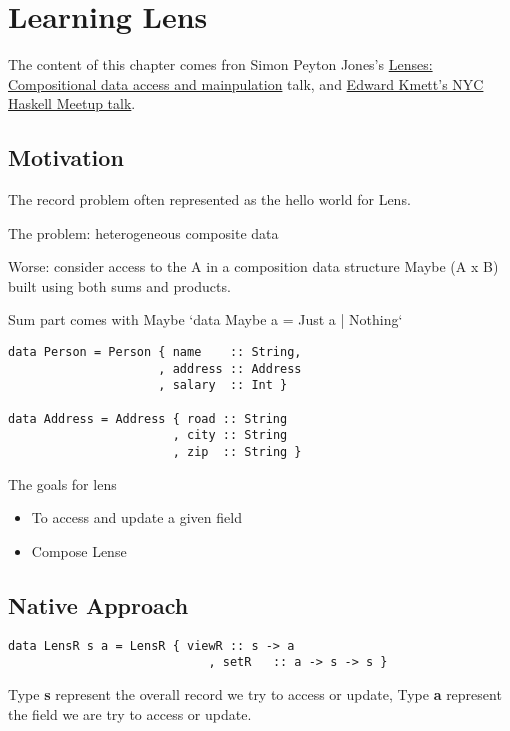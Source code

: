 \chapter{Learning Lens}

The content of this chapter comes fron Simon Peyton Jones's \href{https://skillsmatter.com/skillscasts/4251-lenses-compositional-data-access-and-manipulation}{Lenses: Compositional data access and mainpulation} talk,
and \href{https://www.youtube.com/watch?v=cefnmjtAolY}{Edward Kmett's NYC Haskell Meetup talk}.

\section{Motivation}

The record problem often represented as the hello world for Lens.

The problem: heterogeneous composite data

Worse: consider access to the A in a composition data structure
Maybe (A x B) built using both sums and products.

Sum part comes with Maybe `data Maybe a = Just a | Nothing`

\begin{verbatim}
data Person = Person { name    :: String,
                     , address :: Address
                     , salary  :: Int }

data Address = Address { road :: String
                       , city :: String
                       , zip  :: String }
\end{verbatim}


The goals for lens
\begin{itemize}
\item To access and update a given field
\item Compose Lense
\end{itemize}

\section{Native Approach}


\begin{verbatim}
data LensR s a = LensR { viewR :: s -> a
                            , setR   :: a -> s -> s }
\end{verbatim}

Type \textbf{s} represent the overall record we try to access or update, Type \textbf{a} represent the field we are try to access or update.

